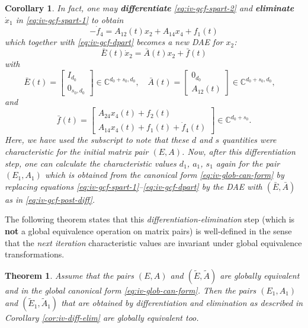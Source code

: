 \documentclass[]{book}
\newtheorem{theorem}{Theorem}[chapter]
\newtheorem{corollary}{Corollary}[chapter]
\theoremstyle{definition}
\theoremstyle{definition}
\theoremstyle{definition}
\theoremstyle{definition}
\theoremstyle{remark}
\begin{document}
\begin{corollary}
\protect\hypertarget{cor:iv-diff-elim}{}{\label{cor:iv-diff-elim} }In fact, one may \textbf{differentiate} \eqref{eq:iv-gcf-spart-2} and \textbf{eliminate} \(\dot x_1\) in \eqref{eq:iv-gcf-spart-1} to obtain
\[
-\dot f_4 = A_{12}(t)x_2 + A_{14}x_4 + f_1(t)
\]
which together with \eqref{eq:iv-gcf-dpart} becomes a new DAE for \(x_2\):
\[
\bar E(t) \dot x_2 = \bar A(t) x_2 + \bar f(t)
\]
with
\begin{equation}
\bar E(t) = 
\begin{bmatrix}
I_{d_0} \\ 0_{s_0, d_0} 
\end{bmatrix}\in \mathbb C^{d_0+s_0, d_0}, \quad
\bar A(t) =
\begin{bmatrix}
0_{d_0} \\ A_{12}(t)
\end{bmatrix} \in \mathbb C^{d_0+s_0, d_0}, \quad \label{eq:iv-gcf-post-diff}
\end{equation}
and
\[
\bar f(t) =
\begin{bmatrix}
A_{24}x_4(t) + f_2(t) \\ A_{14}x_4(t)+f_1(t)+\dot f_4(t)
\end{bmatrix} \in \mathbb C^{d_0+s_0}.
\]
Here, we have used the subscript to note that these \(d\) and \(s\) quantities were characteristic for the initial matrix pair \((E, A)\). Now, after this differentiation step, one can calculate the characteristic values \(d_1\), \(a_1\), \(s_1\) again for the pair \((E_1, A_1)\) which is obtained from the canonical form \eqref{eq:iv-glob-can-form} by replacing equations \eqref{eq:iv-gcf-spart-1}--\eqref{eq:iv-gcf-dpart} by the DAE with \((\bar E, \bar A)\) as in \eqref{eq:iv-gcf-post-diff}.
\end{corollary}

The following theorem states that this \emph{differentiation-elimination} step
(which is \textbf{not} a global equivalence operation on matrix pairs) is well-defined in the sense that the \emph{next iteration} characteristic values are invariant under global equivalence transformations.

\begin{theorem}
\protect\hypertarget{thm:iv-diff-elim-invariant}{}{\label{thm:iv-diff-elim-invariant} }Assume that the pairs \((E, A)\) and \((\tilde E, \tilde A)\) are globally equivalent and in the global canonical form \eqref{eq:iv-glob-can-form}. Then the pairs \((E_1, A_1)\) and \((\tilde E_1, \tilde A_1)\) that are obtained by differentiation and elimination as described in Corollary \ref{cor:iv-diff-elim} are globally equivalent too.
\end{theorem}
\end{document}
